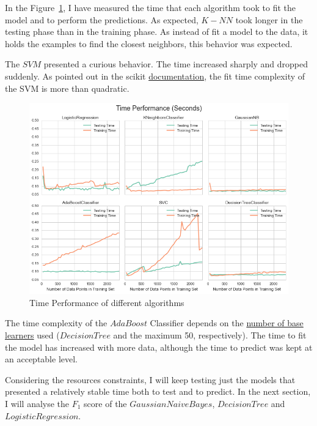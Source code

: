 \documentclass[a4paper]{article}
\begin{document}
In the Figure~\ref{fig:timetest}, I have measured the time that each algorithm took to fit the model and to perform the predictions. As expected, $K-NN$ took longer in the testing phase than in the training phase. As instead of  fit a model to the data, it holds the examples to find the closest neighbors, this behavior was expected. 

The $SVM$ presented a curious behavior. The time increased sharply and dropped suddenly. As pointed out in the scikit \href{http://scikit-learn.org/stable/modules/svm.html#complexity}{documentation}, the fit time complexity of the SVM is more than quadratic.

\begin{figure}[ht]
\centering
\includegraphics[width=1\textwidth]{figures/timePerformance.png}
\caption{\label{fig:timetest}Time Performance of different algorithms}
\end{figure}


The time complexity of the $AdaBoost$ Classifier depends on the \href{http://stackoverflow.com/questions/22397485/what-is-the-o-runtime-complexity-of-adaboost}{number of base learners} used ($Decision Tree$ and the maximum 50, respectively). The time to fit the model has increased with more data, although the time to predict was kept at an acceptable level.

Considering the resources constraints, I will keep testing just the models that presented a relatively stable time both to test and to predict. In the next section, I will analyse the $F_1$ score of the $Gaussian Naive Bayes$, $Decision Tree$ and $Logistic Regression$.
\end{document}
